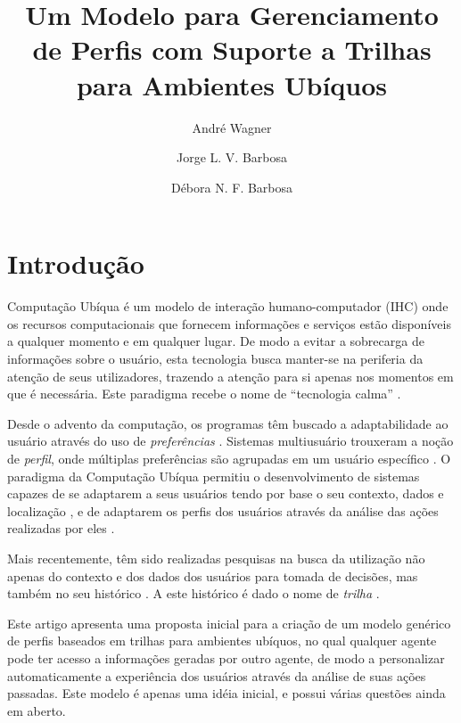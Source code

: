 \documentclass[a4paper, twocolumn]{article}
\author{André Wagner \and Jorge L. V. Barbosa \and Débora N. F. Barbosa}
\title{Um Modelo para Gerenciamento de Perfis com Suporte a Trilhas para Ambientes Ubíquos}
\begin{document}
\maketitle


\section{Introdução}


Computação Ubíqua \cite{weiser91} é um modelo de interação humano-computador (IHC) onde os recursos computacionais que fornecem informações e serviços estão disponíveis a qualquer momento e em qualquer lugar. De modo a evitar a sobrecarga de informações sobre o usuário, esta tecnologia busca manter-se na periferia da atenção de seus utilizadores, trazendo a atenção para si apenas nos momentos em que é necessária. Este paradigma recebe o nome de ``tecnologia calma'' \cite{weiser96}.


Desde o advento da computação, os programas têm buscado a adaptabilidade ao usuário através do uso de \emph{preferências} \cite{??}. Sistemas multiusuário trouxeram a noção de \emph{perfil}, onde múltiplas preferências são agrupadas em um usuário específico \cite{??}. O paradigma da Computação Ubíqua permitiu o desenvolvimento de sistemas capazes de se adaptarem a seus usuários tendo por base o seu contexto, dados e localização \cite{schilit94, dey2001}, e de adaptarem os perfis dos usuários através da análise das ações realizadas por eles \cite{pelep}.


Mais recentemente, têm sido realizadas pesquisas na busca da utilização não apenas do contexto e dos dados dos usuários para tomada de decisões, mas também no seu histórico \cite{smith08,silva09}. A este histórico é dado o nome de \emph{trilha} \cite{driver08}.


Este artigo apresenta uma proposta inicial para a criação de um modelo genérico de perfis baseados em trilhas para ambientes ubíquos, no qual qualquer agente pode ter acesso a informações geradas por outro agente, de modo a personalizar automaticamente a experiência dos usuários através da análise de suas ações passadas. Este modelo é apenas uma idéia inicial, e possui várias questões ainda em aberto.
\end{document}
